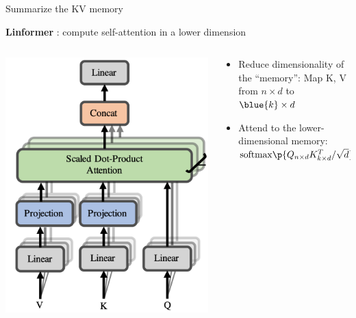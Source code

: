 \documentclass[usenames,dvipsnames,notes,11pt,aspectratio=169,hyperref={colorlinks=true, linkcolor=blue}]{beamer}
\begin{document}
\begin{frame}
    {Summarize the KV memory}

    \textbf{Linformer} : compute self-attention in a lower dimension \\[1em]

    \begin{columns}
        \begin{column}{0.3\textwidth}
        {\includegraphics[width=\textwidth]{figures/linformer}}
        \end{column}
        \begin{column}{0.7\textwidth}
            \begin{itemize}[<+->]
                \item Reduce dimensionality of the ``memory'': Map K, V from $n\times d$ to $\blue{k}\times d$
                \item Attend to the lower-dimensional memory: $\mathrm{softmax}\p{Q_{n\times d}K^T_{k\times d}/\sqrt{d}}$
                    \begin{itemize}

\end{itemize}
\end{itemize}
\end{column}
\end{columns}
\end{frame}
\end{document}
